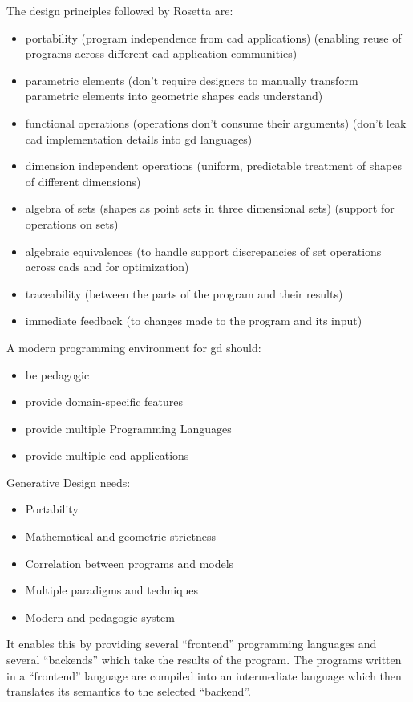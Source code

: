 \documentclass{./llncs2e/llncs}
\begin{document}
	The design principles followed by Rosetta are:
	\begin{itemize}
		\item portability (program independence from \ac{cad} applications) (enabling reuse of programs across different \ac{cad} application communities)
		\item parametric elements (don't require designers to manually transform parametric elements into geometric shapes \ac{cad}s understand)
		\item functional operations (operations don't consume their arguments) (don't leak \ac{cad} implementation details into \ac{gd} languages)
		\item dimension independent operations (uniform, predictable treatment of shapes of different dimensions)
		\item algebra of sets (shapes as point sets in three dimensional sets) (support for operations on sets)
		\item algebraic equivalences (to handle support discrepancies of set operations across \ac{cad}s and for optimization)
		\item traceability (between the parts of the program and their results)
		\item immediate feedback (to changes made to the program and its input)
	\end{itemize}
	
	A modern programming environment for \ac{gd} should:
	\begin{itemize}
		\item be pedagogic
		\item provide domain-specific features
		\item provide multiple Programming Languages
		\item provide multiple \ac{cad} applications
	\end{itemize}
	
	Generative Design needs:
	\begin{itemize}
		\item Portability
		\item Mathematical and geometric strictness
		\item Correlation between programs and models
		\item Multiple paradigms and techniques
		\item Modern and pedagogic system
	\end{itemize}
	
	It enables this by providing several ``frontend'' programming languages and several ``backends'' which take the results of the program. 
	The programs written in a ``frontend'' language are compiled into an intermediate language which then translates its semantics to the selected ``backend''.
	
\end{document}

